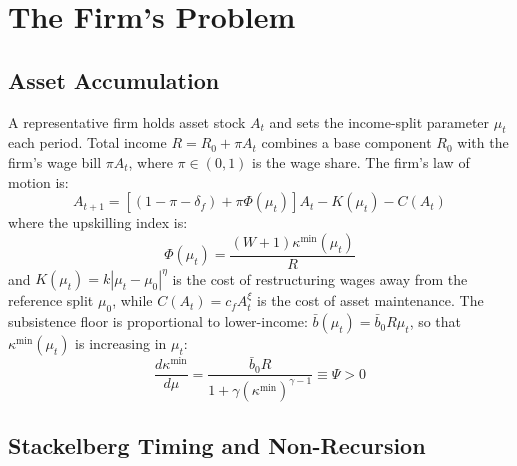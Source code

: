 \documentclass[12pt,a4paper]{article}
\begin{document}
\section{The Firm's Problem}

\subsection{Asset Accumulation}

A representative firm holds asset stock $A_t$ and sets the income-split
parameter $\mu_t$ each period. Total income $R = R_0 + \pi A_t$ combines
a base component $R_0$ with the firm's wage bill $\pi A_t$, where
$\pi \in (0,1)$ is the wage share. The firm's law of motion is:
\begin{equation}
  A_{t+1} = \left[(1-\pi-\delta_f) + \pi\Phi(\mu_t)\right]A_t
             - K(\mu_t) - C(A_t)
  \label{eq:firm_lom}
\end{equation}
where the upskilling index is:
\begin{equation}
  \Phi(\mu_t) = \frac{(W+1)\kappa^{\min}(\mu_t)}{R}
  \label{eq:Phi}
\end{equation}
and $K(\mu_t) = k|\mu_t - \mu_0|^\eta$ is the cost of restructuring
wages away from the reference split $\mu_0$, while
$C(A_t) = c_f A_t^\xi$ is the cost of asset maintenance.
The subsistence floor is proportional to lower-income: $\bar{b}(\mu_t) = \bar{b}_0 R\mu_t$,
so that $\kappa^{\min}(\mu_t)$ is increasing in $\mu_t$:
\begin{equation}
  \frac{d\kappa^{\min}}{d\mu} = \frac{\bar{b}_0 R}{1+\gamma(\kappa^{\min})^{\gamma-1}}
  \equiv \Psi > 0
  \label{eq:dkdmu}
\end{equation}

\subsection{Stackelberg Timing and Non-Recursion}
\end{document}
